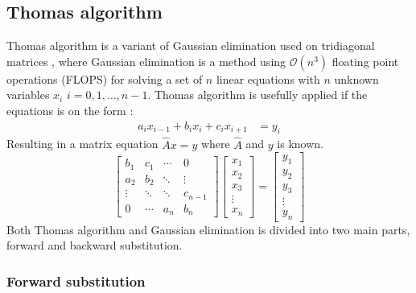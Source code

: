 \documentclass[twoside,twocolumn]{article}
\begin{document}
\subsection{Thomas algorithm}
Thomas algorithm is a variant of Gaussian elimination used on tridiagonal matrices \cite{compfys}, where Gaussian elimination is a method using $\mathcal{O}(n^3)$ floating point operations (FLOPS) for solving a set of $n$ linear equations with $n$ unknown variables $x_i$ $i=0,1,\ldots,n-1$. Thomas algorithm is usefully applied if the equations is on the form :
\begin{align*}
a_{i}x_{i-1}+b_{i}x_i+c_{i}x_{i+1}&=y_i
\end{align*}
Resulting in a matrix equation $\hat{A}x= y$ where $\hat{A}$ and $y$ is known.
\begin{equation*}
\begin{bmatrix}
b_1&c_1&\cdots &0\\
a_2&b_2& \ddots &\vdots\\
\vdots&\ddots&\ddots&c_{n-1}\\
0&\cdots&a_n&b_n
\end{bmatrix}
\begin{bmatrix}
x_1\\x_2\\x_3\\\vdots\\x_{n}
\end{bmatrix}=
\begin{bmatrix}
y_1\\y_2\\y_3\\\vdots\\y_{n}
\end{bmatrix} 
\end{equation*}
Both Thomas algorithm and Gaussian elimination is divided into two main parts, forward and backward substitution.

\subsubsection{Forward substitution}
\end{document}
